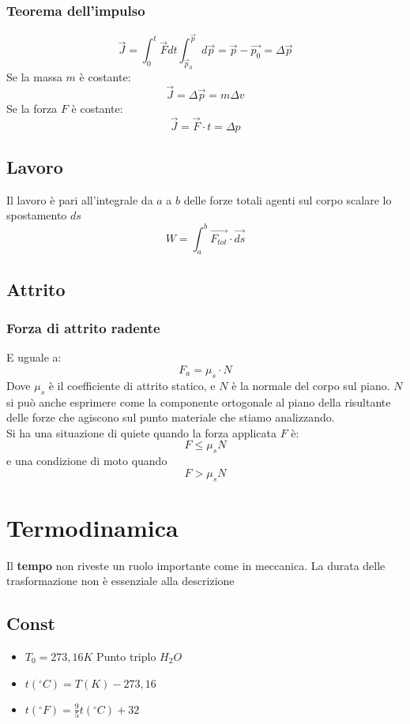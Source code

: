\documentclass[a4paper]{report}
\begin{document}
  \subsection{Teorema dell'impulso}
  \[ \vec{J} = \int_0^t \vec{F} dt \int_{\vec{p}_0}^{\vec{p}} d\vec{p} = \vec{p} - \vec{p_0} = \Delta \vec{p} \]
  Se la massa $m$ è costante:
  \[ \vec{J} = \Delta \vec{p} = m \Delta v \]
  Se la forza $F$ è costante:
  \[ \vec{J} = \vec{F} \cdot t = \Delta p  \]

  \section{Lavoro}
  Il lavoro è pari all'integrale da $a$ a $b$ delle forze totali agenti sul corpo scalare lo spostamento $ds$
  \[ W = \int_{a}^{b} \vec{F_{tot}} \cdot \vec{ds} \]

  \section{Attrito}
  \subsection{Forza di attrito radente}
  E uguale a:
  \[ F_a = \mu_s \cdot N\]
  Dove $\mu_s$ è il coefficiente di attrito statico, e $N$ è la normale del corpo sul piano. $N$ si può anche esprimere come la componente ortogonale al piano della risultante delle forze che agiscono sul punto materiale che stiamo analizzando.
  \\Si ha una situazione di quiete quando la forza applicata $F$ è:
  \[ F \leq \mu_s N \]
  e una condizione di moto quando
  \[ F > \mu_s N \]



  \chapter{Termodinamica}
  Il \textbf{tempo} non riveste un ruolo importante come in meccanica. La durata delle trasformazione non è essenziale alla descrizione

  \section{Const}
  \begin{itemize}
    \item $T_0 = 273,16 K$ Punto triplo $H_2O$
    \item $t(^\circ C)= T(K) - 273,16$
    \item $t(^\circ F)= \frac{9}{5} t(^\circ C) + 32$
  \end{itemize}
\end{document}
